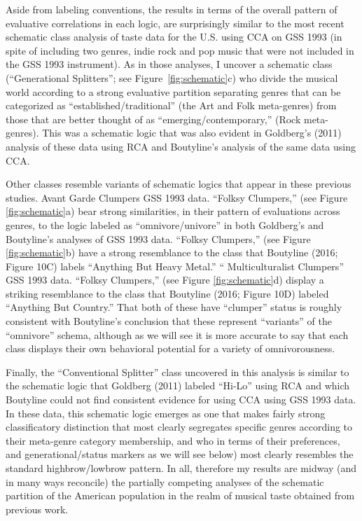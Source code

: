 \documentclass[preprint,12pt]{elsarticle}
\begin{document}
Aside from labeling conventions, the results in terms of the overall pattern of evaluative correlations in each logic, are surprisingly similar to the most recent schematic class analysis of taste data for the U.S. using CCA on GSS 1993 (in spite of including two genres, indie rock and pop music that were not included in the GSS 1993 instrument). As in those analyses, I uncover a schematic class  (``Generational Splitters''; see Figure~\ref{fig:schematic}c) who divide the musical world according to a strong evaluative partition separating genres that can be categorized as ``established/traditional'' (the Art and Folk meta-genres) from those that are better thought of as ``emerging/contemporary,'' (Rock meta-genres). This was a schematic logic that was also evident in Goldberg's (2011) analysis of these data using RCA and Boutyline's analysis of the same data using CCA. 

Other classes resemble variants of schematic logics that appear in these previous studies. Avant Garde Clumpers GSS 1993 data. ``Folksy Clumpers,'' (see Figure \ref{fig:schematic}a) bear strong similarities, in their pattern of evaluations across genres, to the logic labeled as ``omnivore/univore'' in both Goldberg's and Boutyline's analyses of GSS 1993 data. ``Folksy Clumpers,'' (see Figure \ref{fig:schematic}b) have a strong resemblance to the class that Boutyline (2016; Figure 10C) labels ``Anything But Heavy Metal.'' `` Multiculturalist Clumpers'' GSS 1993 data. ``Folksy Clumpers,'' (see Figure \ref{fig:schematic}d) display a striking resemblance to the class that Boutyline (2016; Figure 10D) labeled ``Anything But Country.'' That both of these have ``clumper'' status is roughly consistent with Boutyline's conclusion that these represent ``variants'' of the ``omnivore'' schema, although as we will see it is more accurate to say that each class displays their own behavioral potential for a variety of omnivorousness.   

Finally, the ``Conventional Splitter'' class uncovered in this analysis is similar to the schematic logic that Goldberg (2011) labeled ``Hi-Lo'' using RCA and which Boutyline could not find consistent evidence for using CCA using GSS 1993 data. In these data, this schematic logic emerges as one that makes fairly strong classificatory distinction that most clearly segregates specific genres according to their meta-genre category membership, and who in terms of their preferences, and generational/status markers as we will see below) most clearly resembles the standard highbrow/lowbrow pattern. In all, therefore my results are midway (and in many ways reconcile) the partially competing analyses of the schematic partition of the American population in the realm of musical taste obtained from previous work.  
\end{document}
